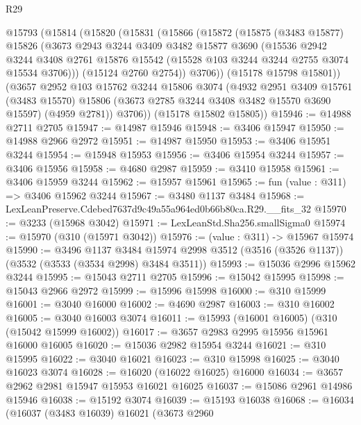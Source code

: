 \begin{lexlean}{R29}
\begin{coremodule}
  @15793
    (@15814
      (@15820
        (@15831
          (@15866
            (@15872
              (@15875
                (@3483 @15877)
                @15826
                (@3673
                  @2943
                  @3244
                  @3409
                  @3482
                  @15877
                  @3690
                  (@15536
                    @2942
                    @3244
                    @3408
                    @2761
                    @15876
                    @15542
                    (@15528 @103 @3244 @3244 @2755 @3074 @15534 @3706)))
                (@15124 @2760 @2754))
              @3706))
          (@15178 @15798 @15801))
        (@3657
          @2952
          @103
          @15762
          @3244
          @15806
          @3074
          (@4932
            @2951
            @3409
            @15761
            (@3483 @15570)
            @15806
            (@3673 @2785 @3244 @3408 @3482 @15570 @3690 @15597)
            (@4959 @2781))
          @3706))
      (@15178 @15802 @15805))
@15946 := @14988 @2711 @2705
@15947 := @14987 @15946
@15948 := @3406 @15947
@15950 := @14988 @2966 @2972
@15951 := @14987 @15950
@15953 := @3406 @15951 @3244
@15954 := @15948 @15953
@15956 := @3406 @15954 @3244
@15957 := @3406 @15956
@15958 := @4680 @2987
@15959 := @3410 @15958
@15961 := @3406 @15959 @3244
@15962 := @15957 @15961
@15965 := fun (value : @311) => @3406 @15962 @3244
@15967 := @3480 @1137 @3484
@15968 := LexLeanPreserve.Cdebed7637d9c49a55a964ed0b66b80ca.R29.__fits_32
@15970 := @3233 (@15968 @3042)
@15971 := LexLeanStd.Sha256.smallSigma0
@15974 := @15970 (@310 (@15971 @3042))
@15976 := (value : @311) -> @15967 @15974
@15990 := @3496
    @1137
    @3484
    @15974
    @2998
    @3512
    (@3516 (@3526 @1137))
    (@3532 (@3533 (@3534 @2998) @3484 @3511))
@15993 := @15036 @2996 @15962 @3244
@15995 := @15043 @2711 @2705
@15996 := @15042 @15995
@15998 := @15043 @2966 @2972
@15999 := @15996 @15998
@16000 := @310 @15999
@16001 := @3040 @16000
@16002 := @4690 @2987
@16003 := @310 @16002
@16005 := @3040 @16003 @3074
@16011 := @15993 (@16001 @16005) (@310 (@15042 @15999 @16002))
@16017 := @3657 @2983 @2995 @15956 @15961 @16000 @16005
@16020 := @15036 @2982 @15954 @3244
@16021 := @310 @15995
@16022 := @3040 @16021
@16023 := @310 @15998
@16025 := @3040 @16023 @3074
@16028 := @16020 (@16022 @16025) @16000
@16034 := @3657 @2962 @2981 @15947 @15953 @16021 @16025
@16037 := @15086 @2961 @14986 @15946
@16038 := @15192 @3074
@16039 := @15193 @16038
@16068 := @16034
    (@16037
      (@3483 @16039)
      @16021
      (@3673
        @2960

\end{coremodule}
\end{lexlean}
